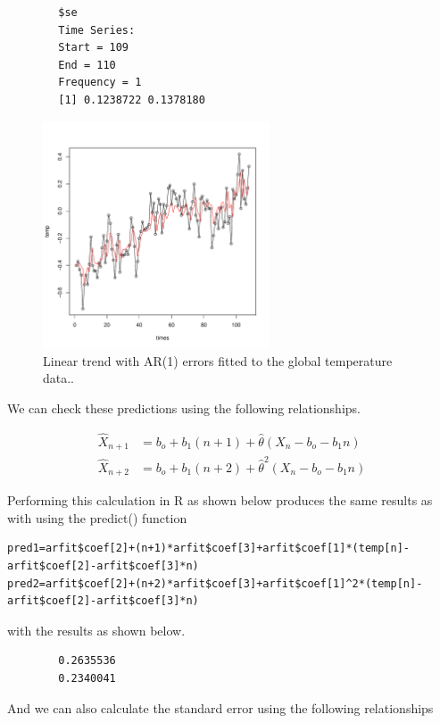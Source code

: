 \documentclass[12pt]{article}
\newenvironment{solution}[2][Solution]{\begin{trivlist}
	\item[\hskip \labelsep {\bfseries #1}]}{\end{trivlist}}
\begin{document}
\begin{solution}{}
\begin{enumerate}[label=(\alph*)]
\begin{lstlisting}
		$se
		Time Series:
		Start = 109
		End = 110
		Frequency = 1
		[1] 0.1238722 0.1378180
		\end{lstlisting}
		
		\begin{figure}[H]
    			\centering
    			\includegraphics[width=0.6\textwidth]{figs/problem_7/temp_ar1_lin.pdf}
    			\caption{Linear trend with AR(1) errors fitted to the global temperature data..}
    			\label{fig:temp_ar1_lin}
		\end{figure}

		We can check these predictions using the following relationships. 
		
		\begin{align*}
		\hat{X}_{n+1} &= b_o + b_1(n+1) + \hat{\theta}(X_n-b_o-b_1n) \\ 
		\hat{X}_{n+2} &= b_o + b_1(n+2) + \hat{\theta}^2(X_n-b_o-b_1n)
		\end{align*}
		
		Performing this calculation in R as shown below produces the same results as with using the predict() function
		
\begin{lstlisting}[breaklines, frame=single,]
pred1=arfit$coef[2]+(n+1)*arfit$coef[3]+arfit$coef[1]*(temp[n]-arfit$coef[2]-arfit$coef[3]*n)
pred2=arfit$coef[2]+(n+2)*arfit$coef[3]+arfit$coef[1]^2*(temp[n]-arfit$coef[2]-arfit$coef[3]*n)
		\end{lstlisting}
		
		with the results as shown below.
		
		\begin{lstlisting}
		0.2635536
		0.2340041
		\end{lstlisting}
		
		And we can also calculate the standard error using the following relationships
		

\end{enumerate}
\end{solution}
\end{document}
